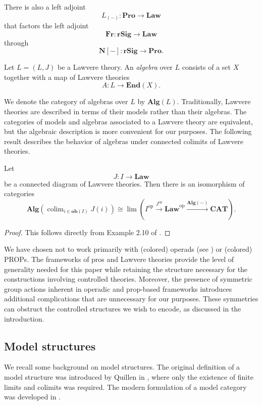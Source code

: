\documentclass{tac}
\begin{document}
There is also a left adjoint
\[
L_{(-)}:\mathbf{Pro}\to\mathbf{Law}
\]
that factors the left adjoint
\[
\mathbf{Fr}:\mathbf{rSig}\to\mathbf{Law}
\]
through
\[
\mathbf{N}[-]:\mathbf{rSig}\to\mathbf{Pro}.
\]

\begin{definition}
Let $L=(L,J)$ be a Lawvere theory. An \emph{algebra} over $L$ consists of a set $X$ together with a map of Lawvere theories
\[
A:L\to\mathbf{End}(X).
\]
\end{definition}

We denote the category of algebras over $L$ by $\mathbf{Alg}(L)$. Traditionally, Lawvere theories are described in terms of their models rather than their algebras. The categories of models and algebras associated to a Lawvere theory are equivalent, but the algebraic description is more convenient for our purposes. The following result describes the behavior of algebras under connected colimits of Lawvere theories.

\begin{theorem}\label{Alg_pre_conn_colimits}
Let
\[
J:I\to\mathbf{Law}
\]
be a connected diagram of Lawvere theories. Then there is an isomorphism of categories
\[
\mathbf{Alg}\left(\operatorname{colim}_{i\in\mathbf{ob}(I)}J(i)\right)
\cong
\lim
\left(
I^{\mathrm{op}}
\xrightarrow{J^{\mathrm{op}}}
\mathbf{Law}^{\mathrm{op}}
\xrightarrow{\mathbf{Alg}(-)}
\mathbf{CAT}
\right).
\]
\end{theorem}

\begin{proof}
This follows directly from Example 2.10 of \cite{ArkorMcDermott2025}.
\end{proof}

We have chosen not to work primarily with (colored) operads (see \cite{Yau2016}) or (colored) PROPs. The frameworks of pros and Lawvere theories provide the level of generality needed for this paper while retaining the structure necessary for the constructions involving controlled theories. Moreover, the presence of symmetric group actions inherent in operadic and prop-based frameworks introduces additional complications that are unnecessary for our purposes. These symmetries can obstruct the controlled structures we wish to encode, as discussed in the introduction.

\subsection*{Model structures}
We recall some background on model structures. The original definition of a model
structure was introduced by Quillen in \cite{Quillen67}, where only the
existence of finite limits and colimits was required. The modern formulation of
a model category was developed in \cite{DwyerHirschhornKan1997}.
\end{document}
